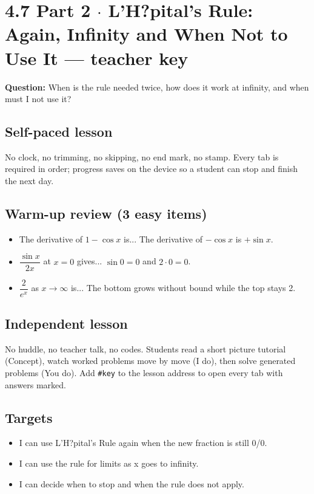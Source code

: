\documentclass[11pt]{article}
\begin{document}
\section*{4.7 Part 2 $\cdot$ L'H?pital's Rule: Again, Infinity and When Not to Use It --- teacher key}
\textbf{Question:} When is the rule needed twice, how does it work at infinity, and when must I not use it?\par
\subsection*{Self-paced lesson}No clock, no trimming, no skipping, no end mark, no stamp. Every tab is required in order; progress saves on the device so a student can stop and finish the next day.\par
\subsection*{Warm-up review (3 easy items)}\begin{itemize}
\item The derivative of $1-\cos x$ is...  The derivative of $-\cos x$ is $+\sin x$.
\item $\dfrac{\sin x}{2x}$ at $x=0$ gives...  $\sin 0=0$ and $2\cdot0=0$.
\item $\dfrac{2}{e^x}$ as $x\to\infty$ is...  The bottom grows without bound while the top stays 2.
\end{itemize}
\subsection*{Independent lesson}No huddle, no teacher talk, no codes. Students read a short picture tutorial (Concept), watch worked problems move by move (I do), then solve generated problems (You do). Add \texttt{\#key} to the lesson address to open every tab with answers marked.\par
\subsection*{Targets}\begin{itemize}\item I can use L'H?pital's Rule again when the new fraction is still 0/0.
\item I can use the rule for limits as x goes to infinity.
\item I can decide when to stop and when the rule does not apply.\end{itemize}
\end{document}
